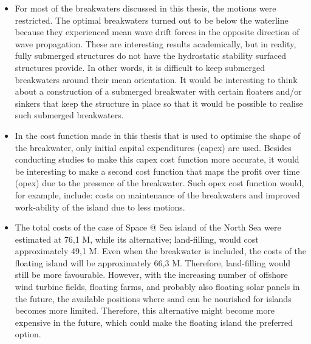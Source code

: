 \begin{itemize}
    \item For most of the breakwaters discussed in this thesis, the motions were restricted. The optimal breakwaters turned out to be below the waterline because they experienced mean wave drift forces in the opposite direction of wave propagation. These are interesting results academically, but in reality, fully submerged structures do not have the hydrostatic stability surfaced structures provide. In other words, it is difficult to keep submerged breakwaters around their mean orientation. It would be interesting to think about a construction of a submerged breakwater with certain floaters and/or sinkers that keep the structure in place so that it would be possible to realise such submerged breakwaters. 
    
    \item In the cost function made in this thesis that is used to optimise the shape of the breakwater, only initial capital expenditures (\acrshort{capex}) are used. Besides conducting studies to make this \acrshort{capex} cost function more accurate, it would be interesting to make a second cost function that maps the profit over time (\acrshort{opex}) due to the presence of the breakwater. Such \acrshort{opex} cost function would, for example, include: costs on maintenance of the breakwaters and improved work-ability of the island due to less motions. 

    \item The total costs of the case of Space @ Sea island of the North Sea were estimated at 76,1 M\texteuro, while its alternative; land-filling, would cost approximately 49,1 M\texteuro. Even when the breakwater is included, the costs of the floating island will be approximately 66,3 M\texteuro. Therefore, land-filling would still be more favourable. However, with the increasing number of offshore wind turbine fields, floating farms, and probably also floating solar panels in the future, the available positions where sand can be nourished for islands becomes more limited. Therefore, this alternative might become more expensive in the future, which could make the floating island the preferred option. 
    

\end{itemize}


